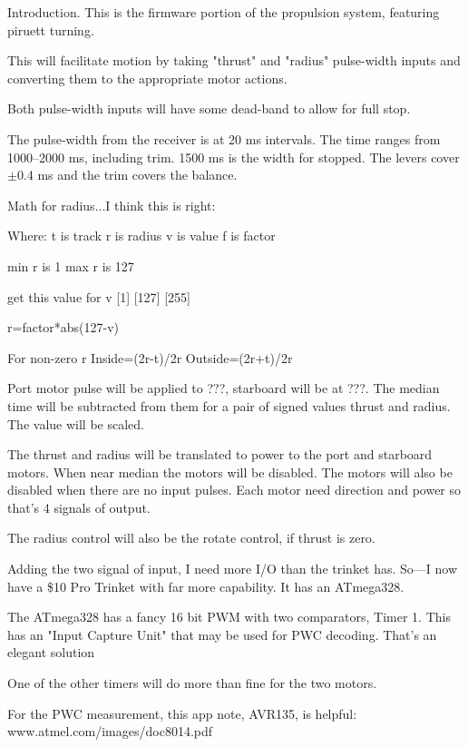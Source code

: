 


\nocon %
\datethis %


Introduction. This is the firmware portion of the propulsion system,
featuring piruett turning.

This will facilitate motion by taking "thrust" and "radius" pulse-width
inputs and converting them to the appropriate motor actions.

Both pulse-width inputs will have some dead-band to allow for full stop.

The pulse-width from the receiver is at 20 ms intervals.
The time ranges from 1000--2000 ms, including trim.
1500 ms is the width for stopped.
The levers cover $\pm$0.4 ms and the trim
covers the balance.

Math for radius...I think this is right:

Where:
t is track
r is radius
v is value
f is factor

min r is 1
max r is 127

get this value for v
[1]
[127]
[255]

r=factor*abs(127-v)


For non-zero r
Inside=(2r-t)/2r
Outside=(2r+t)/2r


Port motor pulse will be applied to ???, starboard will be at ???.
The median time will be subtracted from them for a pair of signed values
thrust and radius. The value will be scaled.

The thrust and radius will be translated to power to the
port and starboard motors. When near median the motors will be disabled.
The motors will also be disabled when there are no input pulses.
Each motor need direction and power so that's 4 signals of output.

The radius control will also be the rotate control, if thrust is zero.

Adding the two signal of input, I need more I/O than the trinket has.
So---I now have a \$10 Pro Trinket with far more capability.
It has an ATmega328.

The ATmega328 has a fancy 16 bit PWM with two comparators, Timer 1.
This has an "Input Capture Unit" that may be used for PWC decoding.
That's an elegant solution



One of the other timers will do more than fine for the two motors.

For the PWC measurement, this app note, AVR135, is helpful:
www.atmel.com/images/doc8014.pdf

